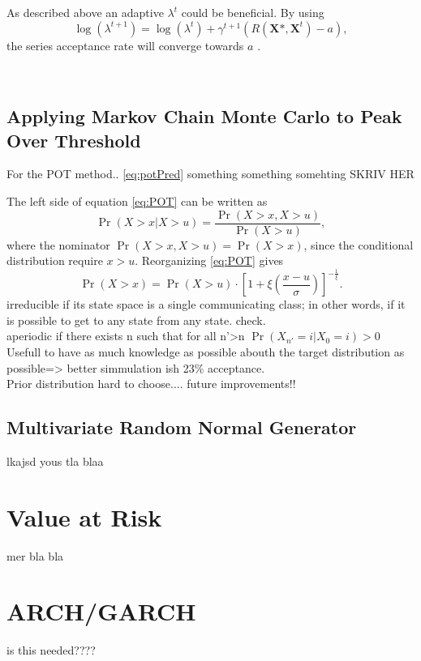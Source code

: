 As described above an adaptive $\lambda^t$ could be beneficial. By using
\begin{equation}
\log(\lambda^{t+1})=\log( \lambda^{t} ) + \gamma^{t+1} \left( R(\boldsymbol{X} \mbox{*},\boldsymbol{X}^{t}) -a \right),
\end{equation}
the series acceptance rate will converge towards $a$ \cite[p.~248]{compstat}.



\cite{AccRate}\\%
\cite[p.~247]{compstat}


\subsection{Applying Markov Chain Monte Carlo to Peak Over Threshold}
For the POT method..
\eqref{eq:potPred} something something somehting SKRIV HER

The left side of equation \ref{eq:POT} can be written as %
\begin{equation}
\Pr(X>x|X>u)=\frac{\Pr(X>x,X>u)}{\Pr(X>u)}, 
\end{equation}
where the nominator $\Pr(X>x,X>u)=\Pr(X>x)$, since the conditional distribution require $x>u$. Reorganizing \ref{eq:POT} gives
\begin{equation}
\Pr(X>x)=\Pr(X>u)\cdot \left[1+\xi \left( \frac{x-u}{\sigma}\right)\right]^{-\frac{1}{\xi}}.
\label{eq:ConProbGev}
\end{equation}
%
%
%
%
%
irreducible if its state space is a single communicating class; in other words, if it is possible to get to any state from any state. check.\\
aperiodic if there exists n such that for all n'>n $\Pr(X_{n'}=i|X_0=i)>0$ 
%
%
Usefull to have as much knowledge as possible abouth the target distribution as possible=> better simmulation ish 23\% acceptance.\\
Prior distribution hard to choose.... future improvements!!



\subsection{Multivariate Random Normal Generator}
lkajsd yous tla blaa
\cite{BM}\\%
\section{Value at Risk}
mer bla bla
\section{ARCH/GARCH}%
is this needed????